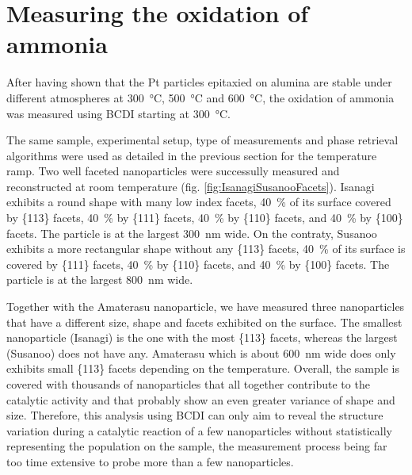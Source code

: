 \section{Measuring the oxidation of ammonia}


After having shown that the Pt particles epitaxied on alumina are stable under different atmospheres at \qty{300}{\degreeCelsius}, \qty{500}{\degreeCelsius} and \qty{600}{\degreeCelsius}, the oxidation of ammonia was measured using BCDI starting at \qty{300}{\degreeCelsius}.

The same sample, experimental setup, type of measurements and phase retrieval algorithms were used as detailed in the previous section for the temperature ramp.
Two well faceted nanoparticles were successully measured and reconstructed at room temperature (fig. \ref{fig:IsanagiSusanooFacets}).
Isanagi exhibits a round shape with many low index facets, \qty{40}{\percent} of its surface covered by \{113\} facets, \qty{40}{\percent} by \{111\} facets, \qty{40}{\percent} by \{110\} facets, and \qty{40}{\percent} by \{100\} facets.
The particle is at the largest \qty{300}{\nm} wide.
On the contraty, Susanoo exhibits a more rectangular shape without any \{113\} facets, \qty{40}{\percent} of its surface is covered by \{111\} facets, \qty{40}{\percent} by \{110\} facets, and \qty{40}{\percent} by \{100\} facets.
The particle is at the largest \qty{800}{\nm} wide.

Together with the Amaterasu nanoparticle, we have measured three nanoparticles that have a different size, shape and facets exhibited on the surface.
The smallest nanoparticle (Isanagi) is the one with the most \{113\} facets, whereas the largest (Susanoo) does not have any.
Amaterasu which is about \qty{600}{\nm} wide does only exhibits small \{113\} facets depending on the temperature.
Overall, the sample is covered with thousands of nanoparticles that all together contribute to the catalytic activity and that probably show an even greater variance of shape and size.
Therefore, this analysis using BCDI can only aim to reveal the structure variation during a catalytic reaction of a few nanoparticles without statistically representing the population on the sample, the measurement process being far too time extensive to probe more than a few nanoparticles.

